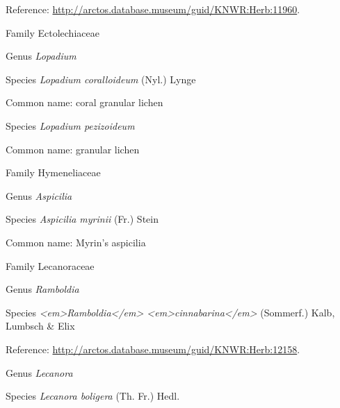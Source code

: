 \documentclass[9pt, article]{memoir}
\begin{document}
\begin{multicols}{2}
Reference: 
\url{http://arctos.database.museum/guid/KNWR:Herb:11960}.

\vspace{6pt}\noindent\hspace{24pt}Family Ectolechiaceae


\vspace{6pt}\noindent\hspace{30pt}Genus \textit{Lopadium}


\vspace{6pt}\noindent\hspace{36pt}Species \textit{Lopadium coralloideum} (Nyl.) Lynge


Common name: coral granular lichen

\vspace{6pt}\noindent\hspace{36pt}Species \textit{Lopadium pezizoideum}


Common name: granular lichen

\vspace{6pt}\noindent\hspace{24pt}Family Hymeneliaceae


\vspace{6pt}\noindent\hspace{30pt}Genus \textit{Aspicilia}


\vspace{6pt}\noindent\hspace{36pt}Species \textit{Aspicilia myrinii} (Fr.) Stein


Common name: Myrin's aspicilia

\vspace{6pt}\noindent\hspace{24pt}Family Lecanoraceae


\vspace{6pt}\noindent\hspace{30pt}Genus \textit{Ramboldia}


\vspace{6pt}\noindent\hspace{36pt}Species \textit{<em>Ramboldia</em> <em>cinnabarina</em>} (Sommerf.) Kalb, Lumbsch \& Elix


Reference: 
\url{http://arctos.database.museum/guid/KNWR:Herb:12158}.

\vspace{6pt}\noindent\hspace{30pt}Genus \textit{Lecanora}


\vspace{6pt}\noindent\hspace{36pt}Species \textit{Lecanora boligera} (Th. Fr.) Hedl.



\end{multicols}
\end{document}
